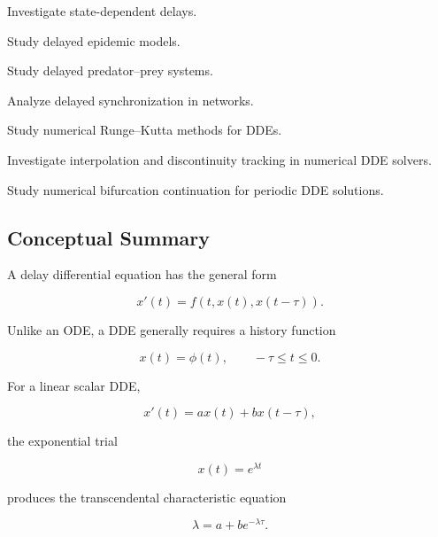 \begin{exercise}[4]
Investigate state-dependent delays.
\end{exercise}

\begin{exercise}[4]
Study delayed epidemic models.
\end{exercise}

\begin{exercise}[4]
Study delayed predator--prey systems.
\end{exercise}

\begin{exercise}[4]
Analyze delayed synchronization in networks.
\end{exercise}

\begin{exercise}[4]
Study numerical Runge--Kutta methods for DDEs.
\end{exercise}

\begin{exercise}[4]
Investigate interpolation and discontinuity tracking in numerical DDE
solvers.
\end{exercise}

\begin{exercise}[4]
Study numerical bifurcation continuation for periodic DDE solutions.
\end{exercise}

\subsection{Conceptual Summary}
\label{subsec:dde-summary}

A delay differential equation has the general form

\[
\boxed{
x'(t)
=
f
\left(
t,
x(t),
x(t-\tau)
\right).
}
\]

Unlike an ODE, a DDE generally requires a history function

\[
\boxed{
x(t)
=
\phi(t),
\qquad
-\tau\leq t\leq0.
}
\]

For a linear scalar DDE,

\[
\boxed{
x'(t)
=
ax(t)
+
bx(t-\tau),
}
\]

the exponential trial

\[
x(t)=e^{\lambda t}
\]

produces the transcendental characteristic equation

\[
\boxed{
\lambda
=
a
+
be^{-\lambda\tau}.
}
\]

